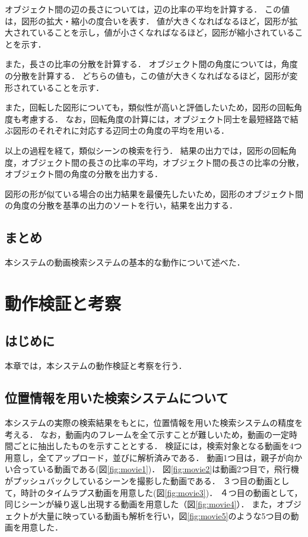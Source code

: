 \documentclass[a4j,12pt,dvipdfmx]{jreport}
\begin{document}
オブジェクト間の辺の長さについては，辺の比率の平均を計算する．
この値は，図形の拡大・縮小の度合いを表す．
値が大きくなればなるほど，図形が拡大されていることを示し，値が小さくなればなるほど，図形が縮小されていることを示す．

また，長さの比率の分散を計算する．
オブジェクト間の角度については，角度の分散を計算する．
どちらの値も，この値が大きくなればなるほど，図形が変形されていることを示す．

また，回転した図形についても，類似性が高いと評価したいため，図形の回転角度も考慮する．
なお，回転角度の計算には，オブジェクト同士を最短経路で結ぶ図形のそれぞれに対応する辺同士の角度の平均を用いる．

以上の過程を経て，類似シーンの検索を行う．
結果の出力では，図形の回転角度，オブジェクト間の長さの比率の平均，オブジェクト間の長さの比率の分散，オブジェクト間の角度の分散を出力する．

図形の形が似ている場合の出力結果を最優先したいため，図形のオブジェクト間の角度の分散を基準の出力のソートを行い，結果を出力する．

\section{まとめ}\label{chap:3-6}
本システムの動画検索システムの基本的な動作について述べた．

\clearpage

\chapter{動作検証と考察}
\label{sec:consideration}

\section{はじめに}\label{chap4-1}
本章では，本システムの動作検証と考察を行う．

\section{位置情報を用いた検索システムについて}\label{chap4-2}
本システムの実際の検索結果をもとに，位置情報を用いた検索システムの精度を考える．
なお，動画内のフレームを全て示すことが難しいため，動画の一定時間ごとに抽出したものを示すこととする．
検証には，検索対象となる動画を4つ用意し，全てアップロード，並びに解析済みである．
動画1つ目は，親子が向かい合っている動画である(図\ref{fig:movie1})．
図\ref{fig:movie2}は動画2つ目で，飛行機がプッシュバックしているシーンを撮影した動画である．
３つ目の動画として，時計のタイムラプス動画を用意した(図\ref{fig:movie3})．
４つ目の動画として，同じシーンが繰り返し出現する動画を用意した（図\ref{fig:movie4}）．
また，オブジェクトが大量に映っている動画も解析を行い，図\ref{fig:movie5}のような5つ目の動画を用意した．
\end{document}
